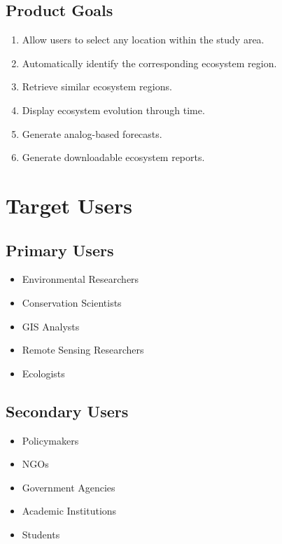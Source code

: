 \documentclass[11pt,a4paper]{article}
\begin{document}
\subsection{Product Goals}

\begin{enumerate}
\item Allow users to select any location within the study area.
\item Automatically identify the corresponding ecosystem region.
\item Retrieve similar ecosystem regions.
\item Display ecosystem evolution through time.
\item Generate analog-based forecasts.
\item Generate downloadable ecosystem reports.
\end{enumerate}

\section{Target Users}

\subsection{Primary Users}

\begin{itemize}
\item Environmental Researchers
\item Conservation Scientists
\item GIS Analysts
\item Remote Sensing Researchers
\item Ecologists
\end{itemize}

\subsection{Secondary Users}

\begin{itemize}
\item Policymakers
\item NGOs
\item Government Agencies
\item Academic Institutions
\item Students
\end{itemize}

\end{document}
